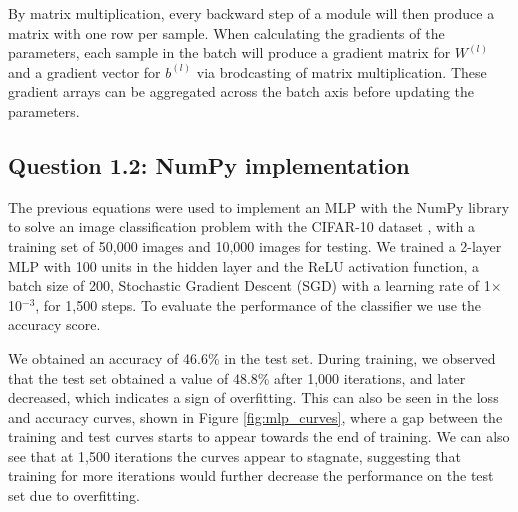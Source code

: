 \documentclass{article}
\begin{document}
By matrix multiplication, every backward step of a module will then produce a matrix with one row per sample. When calculating the gradients of the parameters, each sample in the batch will produce a gradient matrix for $W^{(l)}$ and a gradient vector for $b^{(l)}$ via brodcasting of matrix multiplication. These gradient arrays can be aggregated across the batch axis before updating the parameters.

\subsection*{Question 1.2: NumPy implementation}
\label{sec:numpy}

The previous equations were used to implement an MLP with the NumPy library to solve an image classification problem with the CIFAR-10 dataset \cite{krizhevsky2009learning}, with a training set of 50,000 images and 10,000 images for testing. We trained a 2-layer MLP with 100 units in the hidden layer and the ReLU activation function, a batch size of 200, Stochastic Gradient Descent (SGD) with a learning rate of 1$\times$10$^{-3}$, for 1,500 steps. To evaluate the performance of the classifier we use the accuracy score.

We obtained an accuracy of 46.6\% in the test set. During training, we observed that the test set obtained a value of 48.8\% after 1,000 iterations, and later decreased, which indicates a sign of overfitting. This can also be seen in the loss and accuracy curves, shown in Figure \ref{fig:mlp_curves}, where a gap between the training and test curves starts to appear towards the end of training. We can also see that at 1,500 iterations the curves appear to stagnate, suggesting that training for more iterations would further decrease the performance on the test set due to overfitting.
\end{document}
